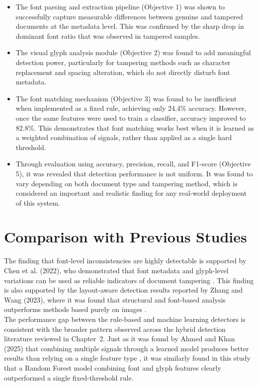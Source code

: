 \begin{itemize}
    \item The font parsing and extraction pipeline (Objective 1) was shown to successfully capture measurable differences between genuine and tampered documents at the metadata level. This was confirmed by the sharp drop in dominant font ratio that was observed in tampered samples.
    \item The visual glyph analysis module (Objective 2) was found to add meaningful detection power, particularly for tampering methods such as character replacement and spacing alteration, which do not directly disturb font metadata.
    \item The font matching mechanism (Objective 3) was found to be insufficient when implemented as a fixed rule, achieving only 24.4\% accuracy. However, once the same features were used to train a classifier, accuracy improved to 82.8\%. This demonstrates that font matching works best when it is learned as a weighted combination of signals, rather than applied as a single hard threshold.
    \item Through evaluation using accuracy, precision, recall, and F1-score (Objective 5), it was revealed that detection performance is not uniform. It was found to vary depending on both document type and tampering method, which is considered an important and realistic finding for any real-world deployment of this system.
\end{itemize}

\section{Comparison with Previous Studies}

The finding that font-level inconsistencies are highly detectable is supported by Chen et al. (2022), who demonstrated that font metadata and glyph-level variations can be used as reliable indicators of document tampering \cite{Chen2022FontForgery}. This finding is also supported by the layout-aware detection results reported by Zhang and Wang (2023), where it was found that structural and font-based analysis outperforms methods based purely on images \cite{Zhang2023PDFLayout}.\\

\noindent The performance gap between the rule-based and machine learning detectors is consistent with the broader pattern observed across the hybrid detection literature reviewed in Chapter~2. Just as it was found by Ahmed and Khan (2025) that combining multiple signals through a learned model produces better results than relying on a single feature type \cite{Ahmed2025AIForgeries}, it was similarly found in this study that a Random Forest model combining font and glyph features clearly outperformed a single fixed-threshold rule.\\

